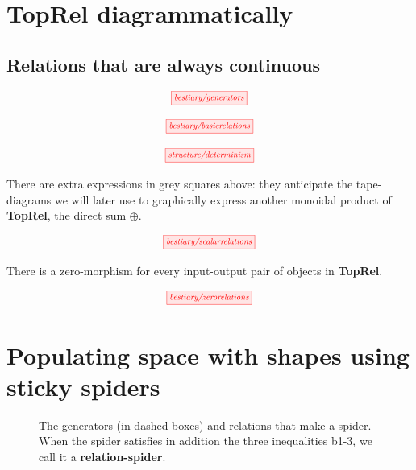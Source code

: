 \documentclass{tufte-handout}
\theoremstyle{definition}
\begin{document}
\begin{fullwidth}

\section{\textbf{TopRel} diagrammatically}

\subsection{Relations that are always continuous}


\[\scalebox{0.75}{\tikzfig{bestiary/generators}}\]


\[\scalebox{0.75}{\tikzfig{bestiary/basicrelations}}\]


\[\scalebox{0.75}{\tikzfig{structure/determinism}}\]

 There are extra expressions in grey squares above: they anticipate the tape-diagrams we will later use to graphically express another monoidal product of \textbf{TopRel}, the direct sum $\oplus$.

\[\scalebox{0.75}{\tikzfig{bestiary/scalarrelations}}\]

 There is a zero-morphism for every input-output pair of objects in \textbf{TopRel}. 

\[\scalebox{0.75}{\tikzfig{bestiary/zerorelations}}\]

\section{Populating space with shapes using sticky spiders}

\begin{figure}\label{fig:spiderbicate}
\caption{The generators (in dashed boxes) and relations that make a spider. When the spider satisfies in addition the three inequalities b1-3, we call it a \textbf{relation-spider}.}
\end{figure}

\end{fullwidth}
\end{document}
